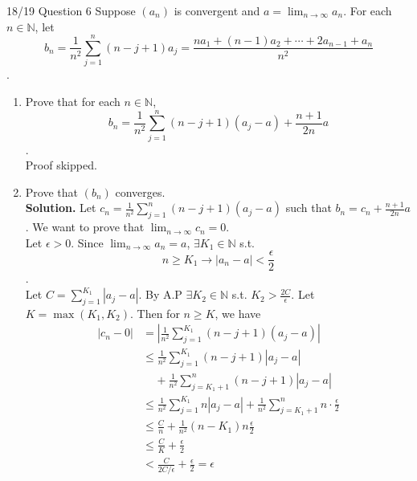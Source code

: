 \documentclass[10pt,landscape]{article}
\theoremstyle{definition}
\newcommand{\thistheoremname}{}
\newtheorem*{genericthm*}{\thistheoremname}
\newenvironment{namedthm*}[1]
{\renewcommand{\thistheoremname}{#1}\begin{genericthm*}}
{\end{genericthm*}}
\begin{document}
\begin{multicols}{3}
\begin{namedthm*}{18/19 Question 6}
    Suppose $(a_n)$ is convergent and $a = \lim_{n \rightarrow \infty}{a_n}$. For each $n \in \mathbb{N}$, let 
    $$b_{n} = \frac{1}{n^2}\sum_{j=1}^{n}(n-j+1)a_{j} = \frac{na_{1}+(n-1)a_{2}+\cdots+2a_{n-1}+a_{n}}{n^2}$$.
    \begin{enumerate}
        \item Prove that for each $n \in \mathbb{N}$,$$b_{n} = \frac{1}{n^2}\sum_{j=1}^{n}(n-j+1)(a_{j}-a) + \frac{n+1}{2n}a$$.\\Proof skipped.
        \item Prove that $(b_{n})$ converges.\\
        \textbf{Solution.} Let $c_{n} = \frac{1}{n^2}\sum_{j=1}^{n}(n-j+1)(a_{j}-a)$ such that $b_{n} = c_{n} + \frac{n+1}{2n}a$. We want to prove that $\lim_{n \rightarrow \infty}{c_n} = 0$.
        \\Let $\epsilon > 0$. Since $\lim_{n \rightarrow \infty}{a_n}=a$, $\exists K_1 \in \mathbb{N}$ s.t. 
        $$n \geq K_{1} \rightarrow |a_{n}-a| < \frac{\epsilon}{2}$$.
        \\Let $C = \sum_{j=1}^{K_1}|a_j-a|$. By A.P $\exists K_2 \in \mathbb{N}$ s.t. $K_2 > \frac{2C}{\epsilon}$. Let $K = \max(K_1,K_2)$. Then for $n \geq K$, we have
        \begin{align*} 
|c_n - 0| &=  \left|\frac{1}{n^2}\sum_{j=1}^{K_1}(n-j+1)(a_{j}-a)\right| \\ 
& \leq  \frac{1}{n^2}\sum_{j=1}^{K_1}(n-j+1)|a_{j}-a|\\ & ~~~~~+ \frac{1}{n^2}\sum_{j=K_{1}+ 1}^{n}(n-j+1)|a_{j}-a|\\
& \leq \frac{1}{n^2}\sum_{j=1}^{K_1}n|a_{j}-a| + \frac{1}{n^2}\sum_{j=K_{1}+ 1}^{n}n\cdot \frac{\epsilon}{2}\\
&\leq \frac{C}{n} + \frac{1}{n^2}(n-K_{1})n\frac{\epsilon}{2}\\
& \leq \frac{C}{K} + \frac{\epsilon}{2}\\
& < \frac{C}{2C/\epsilon} + \frac{\epsilon}{2} = \epsilon
\end{align*}
    \end{enumerate}
\end{namedthm*}


\end{multicols}
\end{document}
